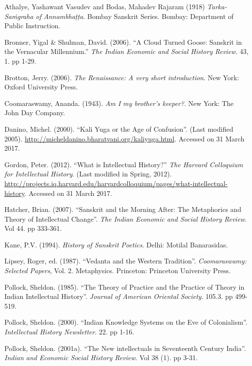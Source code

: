 \begin{thebibliography}{99}
\itemsep=2pt
 Athalye, Yashawant Vasudev and Bodas, Mahadev Rajaram (1918) {\sl Tarka-Saṁgraha of Annambhaṭṭa}. Bombay Sanskrit Series. Bombay: Department of Public Instruction. 

 Bronner, Yigal \& Shulman, David. (2006). “A Cloud Turned Goose: Sanskrit in the Vernacular Millennium.” {\sl The Indian Economic and Social History Review}. 43, 1. pp 1-29.

Brotton, Jerry. (2006). {\sl The Renaissance: A very short introduction}. New York: Oxford University Press. 

Coomaraswamy, Ananda. (1943). {\sl Am I my brother’s keeper?}. New York: The John Day Company. 

Danino, Michel. (2000). “Kali Yuga or the Age of Confusion”. (Last modified 2005). \url{http://micheldanino.bharatvani.org/kaliyuga.html}. Accessed on 31 March 2017.

 Gordon, Peter. (2012). “What is Intellectual History?” {\sl The Harvard Colloquium for Intellectual History}. (Last modified in Spring, 2012). \url{http://projects.iq.harvard.edu/harvardcolloquium/pages/what-intellectual-history}. Accessed on 31 March 2017. 

 Hatcher, Brian. (2007). “Sanskrit and the Morning After: The Metaphorics and Theory of Intellectual Change”. {\sl The Indian Economic and Social History Review}. Vol 44. pp 333-361. 

 Kane, P.V. (1994). {\sl History of Sanskrit Poetics}.  Delhi: Motilal Banarasidas. 

 Lipsey, Roger, ed. (1987). “Vedanta and the Western Tradition”. {\sl Coomaraswamy: Selected Papers}, Vol. 2. Metaphysics. Princeton: Princeton University Press. 

 Pollock, Sheldon. (1985). “The Theory of Practice and the Practice of Theory in Indian Intellectual History”. {\sl Journal of American Oriental Society}. 105.3. pp 499-519. 

 Pollock, Sheldon. (2000). “Indian Knowledge Systems on the Eve of Colonialism”. {\sl Intellectual History Newsletter}. 22. pp 1-16.

 Pollock, Sheldon. (2001a). “The New intellectuals in Seventeenth Century India”. {\sl Indian and Economic Social History Review}. Vol 38 (1). pp 3-31.


\end{thebibliography}
